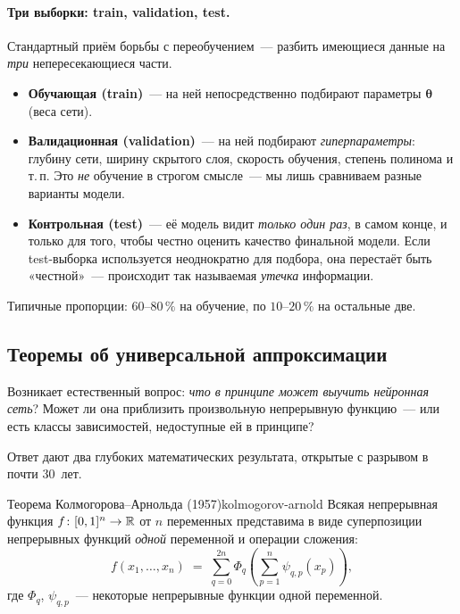 \paragraph{Три выборки: train, validation, test.}
Стандартный приём борьбы с переобучением~--- разбить имеющиеся данные
на \emph{три} непересекающиеся части.

\begin{notebox}[title={Зачем три выборки, а не две?}]
\begin{itemize}\itemsep1pt
  \item \textbf{Обучающая (train)}~--- на ней непосредственно подбирают
        параметры $\boldsymbol\theta$ (веса сети).
  \item \textbf{Валидационная (validation)}~--- на ней подбирают
        \emph{гиперпараметры}: глубину сети, ширину скрытого слоя,
        скорость обучения, степень полинома и т.\,п. Это \emph{не}
        обучение в строгом смысле~--- мы лишь сравниваем разные
        варианты модели.
  \item \textbf{Контрольная (test)}~--- её модель видит \emph{только
        один раз}, в самом конце, и только для того, чтобы честно
        оценить качество финальной модели. Если test-выборка
        используется неоднократно для подбора, она перестаёт быть
        «честной»~--- происходит так называемая \emph{утечка}
        информации.
\end{itemize}
Типичные пропорции: $60$--$80\,\%$ на обучение, по $10$--$20\,\%$
на остальные две.
\end{notebox}

\subsection{Теоремы об универсальной аппроксимации}
\label{ssec:universal}

Возникает естественный вопрос: \emph{что в принципе может выучить
нейронная сеть}? Может ли она приблизить произвольную непрерывную
функцию~--- или есть классы зависимостей, недоступные ей в принципе?

Ответ дают два глубоких математических результата, открытые с разрывом в
почти 30~лет.

\begin{theorem}{Теорема Колмогорова--Арнольда (1957)}{kolmogorov-arnold}
Всякая непрерывная функция $f\colon[0,1]^{n}\to\mathbb{R}$ от $n$ переменных
представима в виде суперпозиции непрерывных функций \emph{одной}
переменной и операции сложения:
\begin{equation}\label{eq:KA}
f(x_1,\dots,x_n)\;=\;\sum_{q=0}^{2n}\Phi_q\!\left(\sum_{p=1}^{n}\psi_{q,p}(x_p)\right),
\end{equation}
где $\Phi_q$, $\psi_{q,p}$~--- некоторые непрерывные функции одной
переменной.
\end{theorem}

